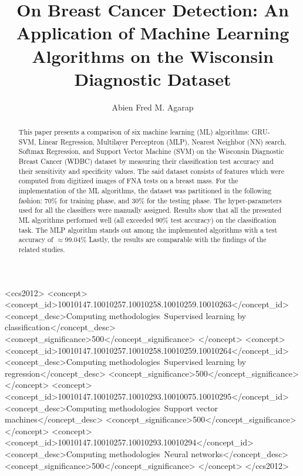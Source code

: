 \documentclass[sigconf]{acmart}
\begin{document}
\title{On Breast Cancer Detection: An Application of Machine Learning Algorithms on the Wisconsin Diagnostic Dataset}

\author{Abien Fred M. Agarap}

\begin{abstract}
This paper presents a comparison of six machine learning (ML) algorithms: GRU-SVM\cite{agarap2017neural}, Linear Regression, Multilayer Perceptron (MLP), Nearest Neighbor (NN) search, Softmax Regression, and Support Vector Machine (SVM) on the Wisconsin Diagnostic Breast Cancer (WDBC) dataset\cite{wolberg1992breast} by measuring their classification test accuracy and their sensitivity and specificity values. The said dataset consists of features which were computed from digitized images of FNA tests on a breast mass\cite{wolberg1992breast}. For the implementation of the ML algorithms, the dataset was partitioned in the following fashion: 70\% for training phase, and 30\% for the testing phase. The hyper-parameters used for all the classifiers were manually assigned. Results show that all the presented ML algorithms performed well (all exceeded 90\% test accuracy) on the classification task. The MLP algorithm stands out among the implemented algorithms with a test accuracy of $\approx$99.04\% Lastly, the results are comparable with the findings of the related studies\cite{salama2012breast, zafiropoulos2006support}.
\end{abstract}

 \begin{CCSXML}
<ccs2012>
<concept>
<concept_id>10010147.10010257.10010258.10010259.10010263</concept_id>
<concept_desc>Computing methodologies~Supervised learning by classification</concept_desc>
<concept_significance>500</concept_significance>
</concept>
<concept>
<concept_id>10010147.10010257.10010258.10010259.10010264</concept_id>
<concept_desc>Computing methodologies~Supervised learning by regression</concept_desc>
<concept_significance>500</concept_significance>
</concept>
<concept>
<concept_id>10010147.10010257.10010293.10010075.10010295</concept_id>
<concept_desc>Computing methodologies~Support vector machines</concept_desc>
<concept_significance>500</concept_significance>
</concept>
<concept>
<concept_id>10010147.10010257.10010293.10010294</concept_id>
<concept_desc>Computing methodologies~Neural networks</concept_desc>
<concept_significance>500</concept_significance>
</concept>
</ccs2012>
\end{CCSXML}
\end{document}
